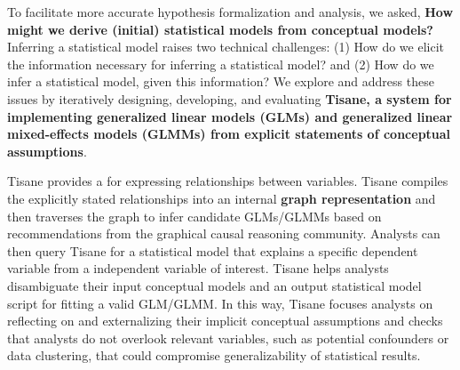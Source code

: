 To facilitate more accurate hypothesis formalization and analysis, we asked,
\textbf{How might we derive (initial) statistical models from conceptual
models?} Inferring a statistical model raises two technical challenges: (1) How
do we elicit the information necessary for inferring a statistical model? and
(2) How do we infer a statistical model, given this information? We explore and
address these issues by iteratively designing, developing, and evaluating
\textbf{Tisane, a system for implementing generalized linear models (GLMs) and
generalized linear mixed-effects models (GLMMs) from explicit statements of conceptual assumptions}. 

Tisane provides a \textbf{\SDSLlong} for expressing %
relationships between variables. Tisane compiles the explicitly stated
relationships into an internal \textbf{graph representation} and then traverses
the graph to infer candidate GLMs/GLMMs based on recommendations from the
graphical causal reasoning community. Analysts can then query Tisane for a
statistical model that explains a specific dependent variable from a independent
variable of interest. Tisane helps analysts disambiguate their input conceptual
models and an output statistical model script for fitting a valid GLM/GLMM. In
this way, Tisane focuses analysts on reflecting on and externalizing their
implicit conceptual assumptions and checks that analysts do not overlook
relevant variables, such as potential confounders or data clustering, that could
compromise generalizability of statistical results. %

